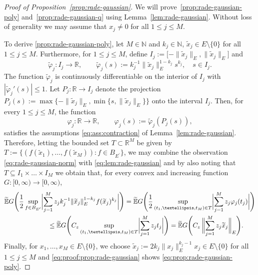 \documentclass[reqno]{amsart}
\numberwithin{equation}{section}
\newcommand{\bbE}{\mathbb{E}}
\newcommand{\bbN}{\mathbb{N}}
\newcommand{\bbR}{\mathbb{R}}
\newcommand{\norm}[2]{     \| #1       \|_{ #2 }}
\newcommand{\dual}[1]{{#1}^{\prime}}
\newcommand{\from}{\colon}
\theoremstyle{remark}
\theoremstyle{definition}
\begin{document}
\begin{proof}[Proof of Proposition~\ref{prop:rade-gaussian}] 
	We will prove~\ref{prop:rade-gaussian-poly} 
	and~\ref{prop:rade-gaussian-q} 
	using Lemma~\ref{lem:rade-gaussian}. 
	Without loss of generality 
	we may assume that $x_j\neq 0$ 
	for all $1\leq j\leq M$. 
	
	To derive \ref{prop:rade-gaussian-poly},  
	let $M\in\bbN$ and 
	$k_j\in\bbN$,  
	$\widetilde{x}_j \in E\setminus\{0\}$ 
	for all $1\leq j\leq M$. 
	Furthermore, for $1\leq j \leq M$, 
	define 
	$I_j := \bigl[ -\norm{\widetilde{x}_j}{E}, \norm{\widetilde{x}_j}{E} \bigr]$ 
	and 
	\begin{equation}\label{eq:varphi-tilde}
	\widetilde{\varphi}_j
	\from 
	I_j \to \bbR, 
	\qquad 
	\widetilde{\varphi}_j(s) 
	:= 
	k_j^{-1} \norm{\widetilde{x}_j}{E}^{1 - k_j}  
	s^{k_j}, 
	\quad
	s\in I_j. 
	\end{equation}
	The function $\widetilde{\varphi}_j$ is continuously differentiable 
	on the interior of $I_j$ 
	with $|\widetilde{\varphi}_j'(s)|\leq 1$. 
	Let 
	$P_j \from \bbR\to I_j$ denote the projection 
	$P_j(s) := \max\{-\norm{\widetilde{x}_j}{E}, \min\{s,\norm{\widetilde{x}_j}{E}\}\}$ 
	onto the interval $I_j$.  
	Then, for every $1\leq j\leq M$, 
	the function 
	\[
	\varphi_j \from \bbR\to \bbR, 
	\qquad 
	\varphi_j(s) := \widetilde{\varphi}_j(P_j(s)), 
	\]
	satisfies the assumptions \eqref{eq:ass:contraction} 
	of Lemma~\ref{lem:rade-gaussian}.  
	Therefore, 
	letting the bounded set $T\subset \bbR^M$ 
	be given by 
	$T:= \{ (f(\widetilde{x}_1), \ldots, f(\widetilde{x}_M)) : f\in B_{\dual{E}} \}$, 
	we may combine the observation \eqref{eq:rade-gaussian-norm} 
	with \eqref{eq:lem:rade-gaussian} 
	and by also noting that $T\subseteq I_1\times \ldots \times I_M$ 
	we obtain that, for every convex and increasing 
	function $G\from [0,\infty) \to [0,\infty)$, 
	\begin{align} 
	\widetilde{\bbE}  
	G\Biggl( \frac{1}{2} 
	\sup_{f\in B_{\dual{E}}} 
	&\biggl| 
	\sum_{j=1}^M 
	z_j k_j^{-1} \norm{\widetilde{x}_j}{E}^{1-k_j} f(\widetilde{x}_j)^{k_j} \biggr| 
	\Biggr) 
	= 
	\widetilde{\bbE}   
	G\Biggl( \frac{1}{2} 
	\sup_{(t_1,\ldots,t_M)\in T} 
	\biggl| 
	\sum_{j=1}^M 
	z_j \varphi_j(t_j) \biggr| 
	\Biggr)  
	\notag 
	\\
	&\quad\leq 
	\widetilde{\bbE}    
	G\Biggl(  
	C_z 
	\sup_{(t_1,\ldots,t_M)\in T} 
	\biggl| 
	\sum_{j=1}^M 
	z_j t_j \biggr| 
	\Biggr)
	=  
	\widetilde{\bbE}   
	G\Biggl(  
	C_z \, 
	\biggl\| 
	\sum_{j=1}^M 
	z_j \widetilde{x}_j \biggr\|_E
	\Biggr).  
	\label{eq:proof:prop:rade-gaussian}   
	\end{align} 
	Finally, for $x_1,\ldots,x_M\in E\setminus\{0\}$, 
	we choose  
	$\widetilde{x}_j := 2 k_j \norm{x_j}{E}^{k_j-1} x_j \in E\setminus\{0\}$ 
	for all $1\leq j\leq M$ 
	and \eqref{eq:proof:prop:rade-gaussian} shows 
	\eqref{eq:prop:rade-gaussian-poly}. 
	

\end{proof}
\end{document}
